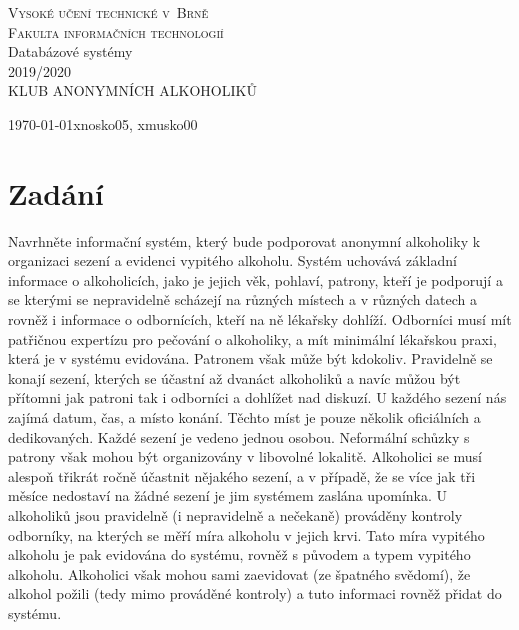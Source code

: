 \documentclass[11pt, a4paper]{article}
\begin{document}
\begin{titlepage}

\begin{center}
	\Huge \textsc{Vysoké učení technické v~Brně}\\
	\huge \textsc{Fakulta informačních technologií}\\
		
	\huge Databázové systémy \\
	\huge 2019/2020\\

	\bigskip 
	\bigskip 
	\huge KLUB ANONYMNÍCH ALKOHOLIKŮ
\end{center}

{\Large \today \hfill xnosko05, xmusko00}
\end{titlepage}


\section{Zadání}
Navrhněte informační systém, který bude podporovat anonymní alkoholiky k organizaci sezení
a evidenci vypitého alkoholu. Systém uchovává základní informace o alkoholicích, jako je
jejich věk, pohlaví, patrony, kteří je podporují a se kterými se nepravidelně scházejí na různých
místech a v různých datech a rovněž i informace o odbornících, kteří na ně lékařsky dohlíží.
Odborníci musí mít patřičnou expertízu pro pečování o alkoholiky, a mít minimální lékařskou
praxi, která je v systému evidována. Patronem však může být kdokoliv. Pravidelně se konají
sezení, kterých se účastní až dvanáct alkoholiků a navíc můžou být přítomni jak patroni tak i
odborníci a dohlížet nad diskuzí. U každého sezení nás zajímá datum, čas, a místo konání.
Těchto míst je pouze několik oficiálních a dedikovaných. Každé sezení je vedeno jednou
osobou. Neformální schůzky s patrony však mohou být organizovány v libovolné lokalitě.
Alkoholici se musí alespoň třikrát ročně účastnit nějakého sezení, a v případě, že se více jak tři
měsíce nedostaví na žádné sezení je jim systémem zaslána upomínka. U alkoholiků jsou
pravidelně (i nepravidelně a nečekaně) prováděny kontroly odborníky, na kterých se měří míra
alkoholu v jejich krvi. Tato míra vypitého alkoholu je pak evidována do systému, rovněž s
původem a typem vypitého alkoholu. Alkoholici však mohou sami zaevidovat (ze špatného
svědomí), že alkohol požili (tedy mimo prováděné kontroly) a tuto informaci rovněž přidat do
systému.
\end{document}
